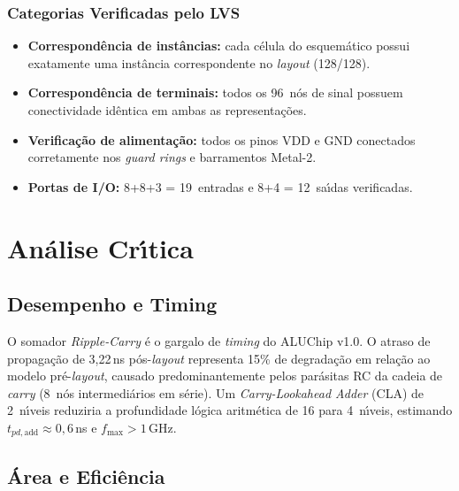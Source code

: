 \documentclass[12pt,a4paper]{article}
\begin{document}
\subsubsection{Categorias Verificadas pelo LVS}

\begin{itemize}[leftmargin=1.5em]
  \item \textbf{Correspond\^{e}ncia de inst\^{a}ncias:} cada c\'{e}lula do esquem\'{a}tico possui exatamente uma inst\^{a}ncia correspondente no \textit{layout} (128/128).
  \item \textbf{Correspond\^{e}ncia de terminais:} todos os 96~n\'{o}s de sinal possuem conectividade id\^{e}ntica em ambas as representa\c{c}\~{o}es.
  \item \textbf{Verifica\c{c}\~{a}o de alimenta\c{c}\~{a}o:} todos os pinos VDD e GND conectados corretamente nos \textit{guard rings} e barramentos Metal-2.
  \item \textbf{Portas de I/O:} 8+8+3 = 19~entradas e 8+4 = 12~sa\'{\i}das verificadas.
\end{itemize}

\section{An\'{a}lise Cr\'{\i}tica}

\subsection{Desempenho e Timing}

O somador \textit{Ripple-Carry} \'{e} o gargalo de \textit{timing} do ALUChip v1.0. O atraso de propaga\c{c}\~{a}o de 3,22\,ns p\'{o}s-\textit{layout} representa 15\% de degrada\c{c}\~{a}o em rela\c{c}\~{a}o ao modelo pr\'{e}-\textit{layout}, causado predominantemente pelos par\'{a}sitas RC da cadeia de \textit{carry} (8~n\'{o}s intermediários em s\'{e}rie). Um \textit{Carry-Lookahead Adder} (CLA) de 2~n\'{\i}veis reduziria a profundidade l\'{o}gica aritm\'{e}tica de 16 para 4~n\'{\i}veis, estimando $t_{pd,\text{add}} \approx 0{,}6$\,ns e $f_{\max} > 1$\,GHz.

\subsection{\'{A}rea e Efici\^{e}ncia}
\end{document}
